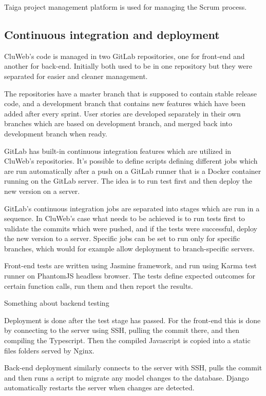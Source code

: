 Taiga project management platform is used for managing the Scrum process.

\subsection{Continuous integration and deployment}
CluWeb's code is managed in two GitLab repositories, one for front-end and another for back-end. Initially both used to be in one repository but they were separated for easier and cleaner management.

The repositories have a master branch that is supposed to contain stable release code, and a development branch that contains new features which have been added after every sprint. User stories are developed separately in their own branches which are based on development branch, and merged back into development branch when ready.

GitLab has built-in continuous integration features which are utilized in CluWeb's repositories. It's possible to define scripts defining different jobs which are run automatically after a push on a GitLab runner that is a Docker container running on the GitLab server. The idea is to run test first and then deploy the new version on a server.

GitLab's continuous integration jobs are separated into stages which are run in a sequence. In CluWeb's case what needs to be achieved is to run tests first to validate the commits which were pushed, and if the tests were successful, deploy the new version to a server. Specific jobs can be set to run only for specific branches, which would for example allow deployment to branch-specific servers.

Front-end tests are written using Jasmine framework, and run using Karma test runner on PhantomJS headless browser. The tests define expected outcomes for certain function calls, run them and then report the results.

Something about backend testing

Deployment is done after the test stage has passed. For the front-end this is done by connecting to the server using SSH, pulling the commit there, and then compiling the Typescript. Then the compiled Javascript is copied into a static files folders served by Nginx.

Back-end deployment similarly connects to the server with SSH, pulls the commit and then runs a script to migrate any model changes to the database. Django automatically restarts the server when changes are detected.


